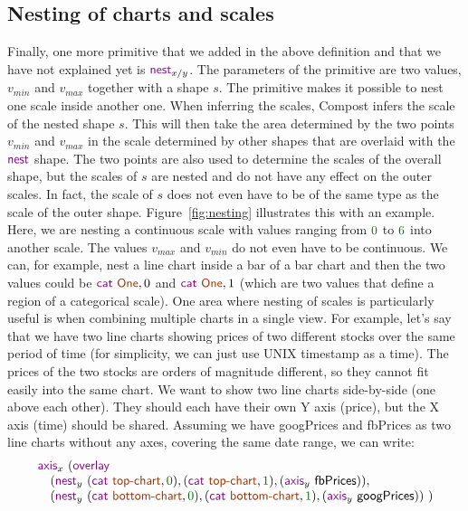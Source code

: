 \documentclass{jfp}
\newcommand{\num}[1]{\textcolor{numclr}{#1}}
\newcommand{\strf}[1]{\textnormal{\textcolor{strclr}{\sffamily #1}}}
\newcommand{\ident}[1]{\textnormal{\textcolor{idclr}{\sffamily #1}}}
\newcommand{\kvd}[1]{\textnormal{\textcolor{kvdclr}{\sffamily #1}}}
\begin{document}
\subsection*{Nesting of charts and scales}
Finally, one more primitive that we added in the above definition and that we have not explained
yet is $\kvd{nest}_{x/y}$. The parameters of the primitive are two values, $v_{min}$ and $v_{max}$
together with a shape $s$. The primitive makes it possible to nest one scale inside another
one.
When inferring the scales, Compost infers the scale of the nested shape $s$. This will then take
the area determined by the two points $v_{min}$ and $v_{max}$ in the scale determined by other
shapes that are overlaid with the $\kvd{nest}$ shape. The two points are also used to determine
the scales of the overall shape, but the scales of $s$ are nested and do not have any effect on
the outer scales. In fact, the scale of $s$ does not even have to be of the same type as the
scale of the outer shape.
Figure~\ref{fig:nesting} illustrates this with an example. Here, we are nesting a continuous scale
with values ranging from $\num{0}$ to $\num{6}$ into another scale. The values $v_{max}$ and
$v_{min}$ do not even have to be continuous. We can, for example, nest a line chart inside a
bar of a bar chart and then the two values could be $\kvd{cat}~\strf{One}, 0$ and $\kvd{cat}~\strf{One}, 1$
(which are two values that define a region of a categorical scale).
One area where nesting of scales is particularly useful is when combining multiple charts in
a single view. For example, let's say that we have two line charts showing prices of two different
stocks over the same period of time (for simplicity, we can just use UNIX timestamp as a time).
The prices of the two stocks are orders of magnitude different, so they cannot fit easily into the
same chart. We want to show two line charts side-by-side (one above each other). They should each
have their own Y axis (price), but the X axis (time) should be shared.
Assuming we have \ident{googPrices} and \ident{fbPrices} as two line charts without any axes,
covering the same date range, we can write:
%
\begin{equation*}
\begin{array}{l}
\kvd{axis}_x~(\kvd{overlay}\\
\quad (\kvd{nest}_y~(\kvd{cat}~\strf{top-chart}, \num{0}), (\kvd{cat}~\strf{top-chart}, \num{1}),
 (\kvd{axis}_y~\ident{fbPrices})),\\
\quad (\kvd{nest}_y~(\kvd{cat}~\strf{bottom-chart}, \num{0}), (\kvd{cat}~\strf{bottom-chart}, \num{1}),
 (\kvd{axis}_y~\ident{googPrices}))~)\\
\end{array}
\end{equation*}
\end{document}

